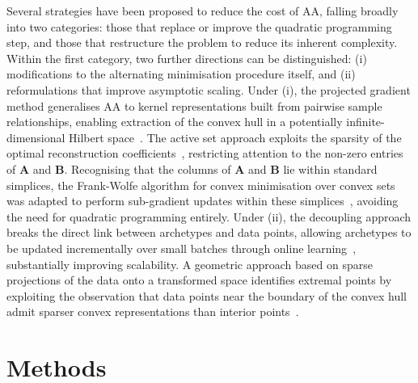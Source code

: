 \documentclass{WileyMSP-template}
\begin{document}
Several strategies have been proposed to reduce the cost of AA, falling broadly into two categories: those that replace or improve the quadratic programming step, and those that restructure the problem to reduce its inherent complexity. Within the first category, two further directions can be distinguished: (i) modifications to the alternating minimisation procedure itself, and (ii) reformulations that improve asymptotic scaling. Under (i), the projected gradient method generalises AA to kernel representations built from pairwise sample relationships, enabling extraction of the convex hull in a potentially infinite-dimensional Hilbert space~\cite{Morup2012kernelAA}. The active set approach exploits the sparsity of the optimal reconstruction coefficients~\cite{Chen2014robustAA}, restricting attention to the non-zero entries of $\mathbf{A}$ and $\mathbf{B}$. Recognising that the columns of $\mathbf{A}$ and $\mathbf{B}$ lie within standard simplices, the Frank-Wolfe algorithm for convex minimisation over convex sets was adapted to perform sub-gradient updates within these simplices~\cite{Bauckhage2015FrankWolfe}, avoiding the need for quadratic programming entirely. Under (ii), the decoupling approach breaks the direct link between archetypes and data points, allowing archetypes to be updated incrementally over small batches through online learning~\cite{Mei2018decoupledAA}, substantially improving scalability. A geometric approach based on sparse projections of the data onto a transformed space identifies extremal points by exploiting the observation that data points near the boundary of the convex hull admit sparser convex representations than interior points~\cite{Abrol2020GeomAA}.



\section{Methods}
\label{sec:method}
\end{document}
